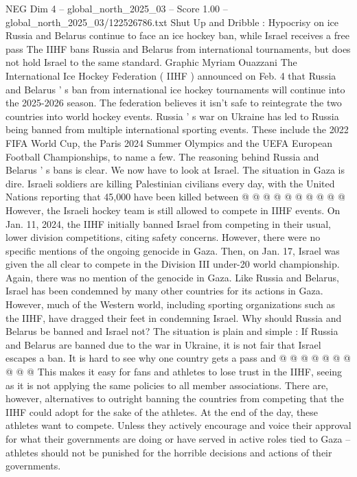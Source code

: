 \begin{textsample}{NEG Dim 4 – global\_north\_2025\_03 – Score 1.00 – global\_north\_2025\_03/122526786.txt}  \label{ex:f4_neg_400}
Shut Up and Dribble : Hypocrisy on ice Russia and Belarus continue to face an ice hockey ban, while Israel receives a free pass The IIHF bans Russia and Belarus from international tournaments, but does not hold Israel to the same standard.
Graphic Myriam Ouazzani The International Ice Hockey Federation ( IIHF ) announced on Feb. 4 that Russia and Belarus ' s ban from international ice hockey tournaments will continue into the 2025-2026 season.
The federation believes it isn't safe to reintegrate the two countries into world hockey events.
Russia ' s war on Ukraine has led to Russia being banned from multiple international sporting events.
These include the 2022 FIFA World Cup, the Paris 2024 Summer Olympics and the UEFA European Football Championships, to name a few.
The reasoning behind Russia and Belarus ' s bans is clear.
We now have to look at Israel.
The situation in Gaza is dire.
Israeli soldiers are killing Palestinian civilians every day, with the United Nations reporting that 45,000 have been killed between @ @ @ @ @ @ @ @ @ @ However, the Israeli hockey team is still allowed to compete in IIHF events.
On Jan. 11, 2024, the IIHF initially banned Israel from competing in their usual, lower division competitions, citing safety concerns.
However, there were no specific mentions of the ongoing genocide in Gaza.
Then, on Jan. 17, Israel was given the all clear to compete in the Division III under-20 world championship.
Again, there was no mention of the genocide in Gaza.
Like Russia and Belarus, Israel has been condemned by many other countries for its actions in Gaza.
However, much of the Western world, including sporting organizations such as the IIHF, have dragged their feet in condemning Israel.
Why should Russia and Belarus be banned and Israel not?
The situation is plain and simple : If Russia and Belarus are banned due to the war in Ukraine, it is not fair that Israel escapes a ban.
It is hard to see why one country gets a pass and @ @ @ @ @ @ @ @ @ @ This makes it easy for fans and athletes to lose trust in the IIHF, seeing as it is not applying the same policies to all member associations.
There are, however, alternatives to outright banning the countries from competing that the IIHF could adopt for the sake of the athletes.
At the end of the day, these athletes want to compete.
Unless they actively encourage and voice their approval for what their governments are doing or have served in active roles tied to Gaza -- athletes should not be punished for the horrible decisions and actions of their governments.

\end{textsample}
